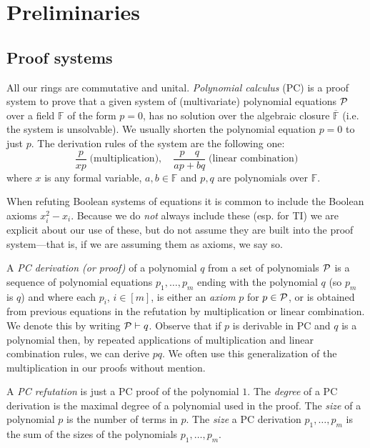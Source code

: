 \documentclass[10pt,a4paper]{article}
\theoremstyle{definition}
\newcommand{\F}{\mathbb{F}}
\begin{document}
\section{Preliminaries} \label{sec:prelim}


\subsection{Proof systems}
All our rings are commutative and unital. {\em Polynomial calculus} (PC) is a proof system to prove that a given system of (multivariate) polynomial equations ${\cal P}$ over a field $\mathbb F$ of the form $p=0$, has no solution over the algebraic closure $\overline{\F}$ (i.e. the system is unsolvable). We usually shorten the polynomial equation $p=0$ to just $p$.
The derivation rules of the system are the following one:
$$
\frac{p}{xp} \; \mbox{(multiplication)}, \quad \frac{p\quad q}{ap+bq} \; \mbox{(linear combination)} 
$$
where $x$ is any formal variable, $a,b \in \mathbb{F}$ and $p,q$ are polynomials over $\mathbb F$.  

When refuting Boolean systems of equations it is common to include the Boolean axioms $x_i^2 - x_i$. Because we do \emph{not} always include these (esp. for \textsc{TI}) we are explicit about our use of these, but do not assume they are built into the proof system---that is, if we are assuming them as axioms, we say so.

A {\em PC derivation (or proof)}  of a  polynomial $q$ from a set of polynomials ${\cal P}$ is a sequence of polynomial equations $p_1,\ldots, p_{m}$ ending with the polynomial $q$ (so $p_m$ is $q$) and where each $p_i$, $i \in [m]$, is either an {\em axiom} $p$ for $p \in  {\cal P}$, or is obtained from previous equations in the refutation by multiplication or linear combination.  We denote this by writing  ${\cal P}\vdash q$.  Observe that if $p$  is derivable in  PC and $q$ is a polynomial then, by repeated applications of multiplication and linear combination rules, we can derive
$pq$. We often use this generalization of the multiplication in our proofs without mention.  

A {\em PC refutation}  is just a PC proof  of the polynomial $1$.   The {\em degree} of a PC derivation is the maximal degree of a polynomial used in the proof. The {\em size} of a polynomial $p$ is the number of  terms in $p$.  The {\em size} a PC derivation $p_1,\ldots, p_m$  is the sum of the sizes of the polynomials $p_1,\ldots,  p_m$. 


\medskip
\end{document}
